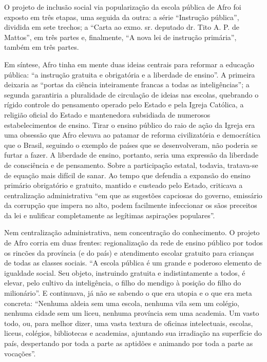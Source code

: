 O projeto de inclusão social via popularização da escola pública de
Afro foi exposto em três etapas, uma seguida da outra: a série
``Instrução pública'', dividida em sete trechos; a ``Carta ao
exmo. sr. deputado dr. Tito A. P. de Mattos'', em três partes e,
finalmente, ``A nova lei de instrução primária'', também em três
partes.

Em síntese, Afro tinha em mente duas ideias centrais para
reformar a educação pública: ``a instrução gratuita e obrigatória e a
liberdade de ensino''. A primeira deixaria as ``portas da ciência
inteiramente francas a todas as inteligências''; a segunda garantiria a
pluralidade de circulação de ideias nas escolas, quebrando o rígido
controle do pensamento operado pelo Estado e pela Igreja Católica, a
religião oficial do Estado e mantenedora subsidiada de numerosos
estabelecimentos de ensino. Tirar o ensino público do raio de ação da
Igreja era uma obsessão que Afro elevava ao patamar de reforma
civilizatória e democrática que o Brasil, seguindo o exemplo de países
que se desenvolveram, não poderia se furtar a fazer. A liberdade de
ensino, portanto, seria uma expressão da liberdade de consciência e de
pensamento. Sobre a participação estatal, todavia, tratava-se de equação
mais difícil de sanar. Ao tempo que defendia a expansão do ensino
primário obrigatório e gratuito, mantido e custeado pelo Estado,
criticava a centralização administrativa ``em que as sugestões capciosas
do governo, emissário da corrupção que impera no alto, podem facilmente
infeccionar os sãos preceitos da lei e nulificar completamente as
legítimas aspirações populares''.

Nem centralização administrativa, nem concentração do conhecimento. O
projeto de Afro corria em duas frentes: regionalização da rede de
ensino público por todos os rincões da província (e do país) e
atendimento escolar gratuito para crianças de todas as classes sociais.
``A escola pública é um grande e poderoso elemento de igualdade social.
Seu objeto, instruindo gratuita e indistintamente a todos, é elevar,
pelo cultivo da inteligência, o filho do mendigo à posição do filho do
milionário''. E continuava, já não se sabendo o que era utopia e o que
era meta concreta: ``Nenhuma aldeia sem uma escola, nenhuma vila sem um
colégio, nenhuma cidade sem um liceu, nenhuma província sem uma
academia. Um vasto todo, ou, para melhor dizer, uma vasta textura de
oficinas intelectuais, escolas, liceus, colégios, bibliotecas e
academias, ajuntando sua irradiação na superfície do país, despertando
por toda a parte as aptidões e animando por toda a parte as vocações''.

